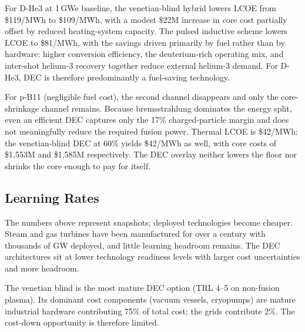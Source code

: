 \documentclass{article}
\begin{document}
For D-He3 at 1\,GWe baseline, the venetian-blind hybrid lowers
LCOE from \$119/MWh to \$109/MWh, with a modest \$22M
increase in core cost partially offset by reduced heating-system
capacity. The pulsed inductive scheme lowers LCOE to \$81/MWh,
with the savings driven primarily by fuel rather than by hardware:
higher conversion efficiency, the deuterium-rich operating mix, and
inter-shot helium-3 recovery together reduce external helium-3
demand. For D-He3, DEC is therefore predominantly a fuel-saving
technology.

For p-B11 (negligible fuel cost), the second channel disappears
and only the core-shrinkage channel remains. Because bremsstrahlung
dominates the energy split, even an efficient DEC captures only the
17\% charged-particle margin and does not meaningfully reduce the
required fusion power. Thermal LCOE is \$42/MWh; the
venetian-blind DEC at 60\% yields \$42/MWh as well, with core
costs of \$1{,}553M and \$1{,}585M respectively. The DEC overlay
neither lowers the floor nor shrinks the core enough to pay for
itself.

\subsection{Learning Rates}
\label{sec:learning}

The numbers above represent snapshots; deployed technologies become
cheaper. Steam and gas turbines have been manufactured for over a
century with thousands of GW deployed, and little learning headroom
remains. The DEC architectures sit at lower technology readiness
levels with larger cost uncertainties and more headroom.

The venetian blind is the most mature DEC option (TRL 4--5 on
non-fusion plasma). Its dominant cost components (vacuum vessels,
cryopumps) are mature industrial hardware contributing 75\% of
total cost; the grids contribute 2\%. The cost-down
opportunity is therefore limited.
\end{document}
